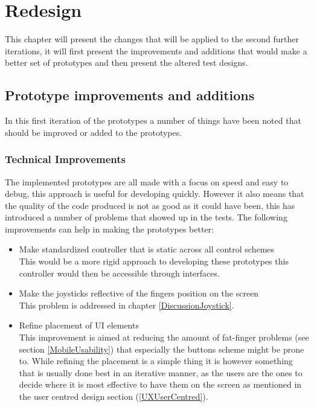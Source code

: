 \chapter {Redesign}
This chapter will present the changes that will be applied to the second further iterations, it will first present the improvements and additions that would make a better set of prototypes and then present the altered test designs.

\section{Prototype improvements and additions}
In this first iteration of the prototypes a number of things have been noted that should be improved or added to the prototypes. 
\subsection{Technical Improvements}
The implemented prototypes are all made with a focus on speed and easy to debug, this approach is useful for developing quickly. However it also means that the quality of the code produced is not as good as it could have been, this has introduced a number of problems that showed up in the tests. The following improvements can help in making the prototypes better:

\begin{itemize}

\item Make standardized controller that is static across all control schemes\\
This would be a more rigid approach to developing these prototypes this controller would then be accessible through interfaces.

\item Make the joysticks reflective of the fingers position on the screen\\
This problem is addressed in chapter \ref{DiscussionJoystick}. 


\item Refine placement of UI elements\\ 
This improvement is aimed at reducing the amount of fat-finger problems (see section \ref{MobileUsability}) that especially the buttons scheme might be prone to. While refining the placement is a simple thing it is however something that is usually done best in an iterative manner, as the users are the ones to decide where it is most effective to have them on the screen as mentioned in the user centred design section (\ref{UXUserCentred}).
\end{itemize}

